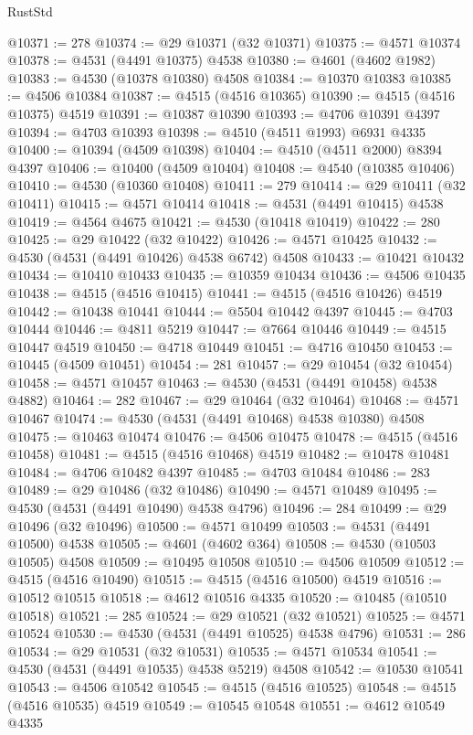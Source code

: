 \begin{lexlean}{RustStd}
\begin{coremodule}
@10371 := 278
@10374 := @29 @10371 (@32 @10371)
@10375 := @4571 @10374
@10378 := @4531 (@4491 @10375) @4538
@10380 := @4601 (@4602 @1982)
@10383 := @4530 (@10378 @10380) @4508
@10384 := @10370 @10383
@10385 := @4506 @10384
@10387 := @4515 (@4516 @10365)
@10390 := @4515 (@4516 @10375) @4519
@10391 := @10387 @10390
@10393 := @4706 @10391 @4397
@10394 := @4703 @10393
@10398 := @4510 (@4511 @1993) @6931 @4335
@10400 := @10394 (@4509 @10398)
@10404 := @4510 (@4511 @2000) @8394 @4397
@10406 := @10400 (@4509 @10404)
@10408 := @4540 (@10385 @10406)
@10410 := @4530 (@10360 @10408)
@10411 := 279
@10414 := @29 @10411 (@32 @10411)
@10415 := @4571 @10414
@10418 := @4531 (@4491 @10415) @4538
@10419 := @4564 @4675
@10421 := @4530 (@10418 @10419)
@10422 := 280
@10425 := @29 @10422 (@32 @10422)
@10426 := @4571 @10425
@10432 := @4530 (@4531 (@4491 @10426) @4538 @6742) @4508
@10433 := @10421 @10432
@10434 := @10410 @10433
@10435 := @10359 @10434
@10436 := @4506 @10435
@10438 := @4515 (@4516 @10415)
@10441 := @4515 (@4516 @10426) @4519
@10442 := @10438 @10441
@10444 := @5504 @10442 @4397
@10445 := @4703 @10444
@10446 := @4811 @5219
@10447 := @7664 @10446
@10449 := @4515 @10447 @4519
@10450 := @4718 @10449
@10451 := @4716 @10450
@10453 := @10445 (@4509 @10451)
@10454 := 281
@10457 := @29 @10454 (@32 @10454)
@10458 := @4571 @10457
@10463 := @4530 (@4531 (@4491 @10458) @4538 @4882)
@10464 := 282
@10467 := @29 @10464 (@32 @10464)
@10468 := @4571 @10467
@10474 := @4530 (@4531 (@4491 @10468) @4538 @10380) @4508
@10475 := @10463 @10474
@10476 := @4506 @10475
@10478 := @4515 (@4516 @10458)
@10481 := @4515 (@4516 @10468) @4519
@10482 := @10478 @10481
@10484 := @4706 @10482 @4397
@10485 := @4703 @10484
@10486 := 283
@10489 := @29 @10486 (@32 @10486)
@10490 := @4571 @10489
@10495 := @4530 (@4531 (@4491 @10490) @4538 @4796)
@10496 := 284
@10499 := @29 @10496 (@32 @10496)
@10500 := @4571 @10499
@10503 := @4531 (@4491 @10500) @4538
@10505 := @4601 (@4602 @364)
@10508 := @4530 (@10503 @10505) @4508
@10509 := @10495 @10508
@10510 := @4506 @10509
@10512 := @4515 (@4516 @10490)
@10515 := @4515 (@4516 @10500) @4519
@10516 := @10512 @10515
@10518 := @4612 @10516 @4335
@10520 := @10485 (@10510 @10518)
@10521 := 285
@10524 := @29 @10521 (@32 @10521)
@10525 := @4571 @10524
@10530 := @4530 (@4531 (@4491 @10525) @4538 @4796)
@10531 := 286
@10534 := @29 @10531 (@32 @10531)
@10535 := @4571 @10534
@10541 := @4530 (@4531 (@4491 @10535) @4538 @5219) @4508
@10542 := @10530 @10541
@10543 := @4506 @10542
@10545 := @4515 (@4516 @10525)
@10548 := @4515 (@4516 @10535) @4519
@10549 := @10545 @10548
@10551 := @4612 @10549 @4335

\end{coremodule}
\end{lexlean}
